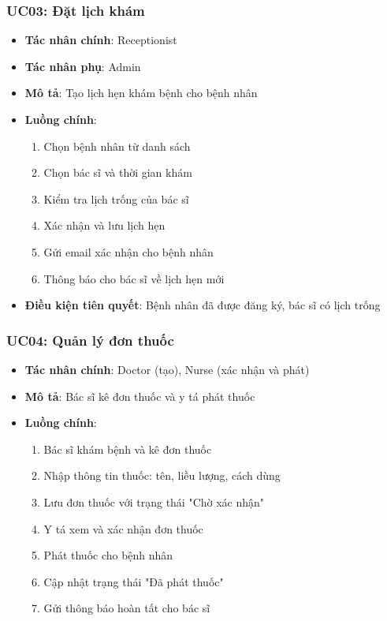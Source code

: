 \documentclass[12pt,a4paper]{report}
\begin{document}
    \subsubsection{UC03: Đặt lịch khám}
    \begin{itemize}
        \item \textbf{Tác nhân chính}: Receptionist
        \item \textbf{Tác nhân phụ}: Admin
        \item \textbf{Mô tả}: Tạo lịch hẹn khám bệnh cho bệnh nhân
        \item \textbf{Luồng chính}:
        \begin{enumerate}
            \item Chọn bệnh nhân từ danh sách
            \item Chọn bác sĩ và thời gian khám
            \item Kiểm tra lịch trống của bác sĩ
            \item Xác nhận và lưu lịch hẹn
            \item Gửi email xác nhận cho bệnh nhân
            \item Thông báo cho bác sĩ về lịch hẹn mới
        \end{enumerate}
        \item \textbf{Điều kiện tiên quyết}: Bệnh nhân đã được đăng ký, bác sĩ có lịch trống
    \end{itemize}

    \subsubsection{UC04: Quản lý đơn thuốc}
    \begin{itemize}
        \item \textbf{Tác nhân chính}: Doctor (tạo), Nurse (xác nhận và phát)
        \item \textbf{Mô tả}: Bác sĩ kê đơn thuốc và y tá phát thuốc
        \item \textbf{Luồng chính}:
        \begin{enumerate}
            \item Bác sĩ khám bệnh và kê đơn thuốc
            \item Nhập thông tin thuốc: tên, liều lượng, cách dùng
            \item Lưu đơn thuốc với trạng thái "Chờ xác nhận"
            \item Y tá xem và xác nhận đơn thuốc
            \item Phát thuốc cho bệnh nhân
            \item Cập nhật trạng thái "Đã phát thuốc"
            \item Gửi thông báo hoàn tất cho bác sĩ
        \end{enumerate}
    \end{itemize}
\end{document}
